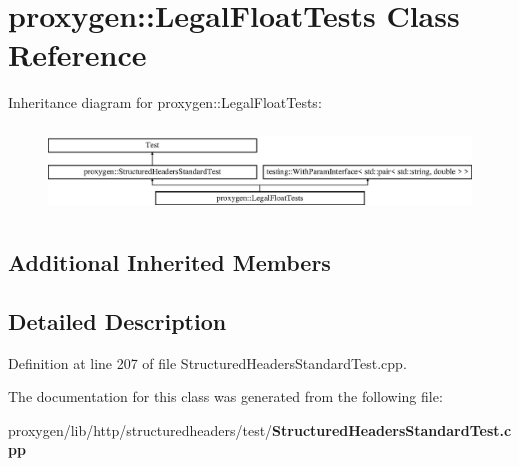 \section{proxygen\+:\+:Legal\+Float\+Tests Class Reference}
\label{classproxygen_1_1LegalFloatTests}
Inheritance diagram for proxygen\+:\+:Legal\+Float\+Tests\+:\begin{figure}[H]
\begin{center}
\leavevmode
\includegraphics[height=2.307692cm]{classproxygen_1_1LegalFloatTests}
\end{center}
\end{figure}
\subsection*{Additional Inherited Members}


\subsection{Detailed Description}


Definition at line 207 of file Structured\+Headers\+Standard\+Test.\+cpp.



The documentation for this class was generated from the following file\+:\begin{DoxyCompactItemize}
\item 
proxygen/lib/http/structuredheaders/test/{\bf Structured\+Headers\+Standard\+Test.\+cpp}\end{DoxyCompactItemize}
